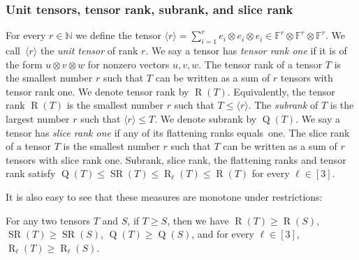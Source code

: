 \documentclass{daj}
\DeclareMathOperator{\subrank}{Q}
\DeclareMathOperator{\slicerank}{SR}
\DeclareMathOperator{\tensorrank}{R}
\newcommand{\FF}{\mathbb{F}}
\newcommand{\NN}{\mathbb{N}}
\begin{document}
%
%
%
%
%
%
%
%

\subsubsection*{Unit tensors, tensor rank, subrank, and slice rank}
For every $r \in \NN$ we define the tensor $\langle r \rangle = \sum_{i=1}^r e_i \otimes e_i \otimes e_i \in \FF^r \otimes \FF^r \otimes \FF^r$. We call~$\langle r \rangle$ the \emph{unit tensor} of rank $r$.
We say a tensor has \emph{tensor rank one} if it is of the form $u \otimes v \otimes w$ for nonzero vectors $u,v,w$.
The tensor rank of a tensor $T$ is the smallest number $r$ such that $T$ can be written as a sum of $r$ tensors with tensor rank one. 
%
We denote tensor rank by $\tensorrank(T)$. Equivalently, the tensor rank $\tensorrank(T)$ is the smallest number $r$ such that $T \leq \langle r\rangle$. The \emph{subrank} of $T$ is the largest number $r$ such that $\langle r\rangle \leq T$. We denote subrank by $\subrank(T)$. 
We say a tensor has \emph{slice rank one} if any of its flattening ranks equals~one. The slice rank of a tensor $T$ is the smallest number $r$ such that $T$ can be written as a sum of $r$ tensors with slice rank one.
%
Subrank, slice rank, the flattening ranks and tensor rank satisfy $\subrank(T) \leq \slicerank(T) \leq \tensorrank_\ell(T) \leq \tensorrank(T)$ for every $\ell\in [3]$.

It is also easy to see that these measures are monotone under restrictions:

\begin{lemma}\label{lem:monotone-restrict}
    For any two tensors $T$ and $S$, if $T\geq S$, then we have $\tensorrank(T)\geq \tensorrank(S)$, $\slicerank(T)\geq \slicerank(S)$, $\subrank(T)\geq \subrank(S)$, and for every $\ell\in[3]$, %
    $\tensorrank_\ell(T)\geq \tensorrank_\ell(S)$.
\end{lemma}
\end{document}
